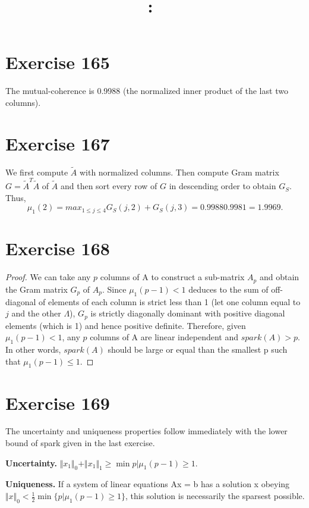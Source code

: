 \documentclass{article}
\date{}
\title{
    \textmd{\textbf{\hmwkClass:\ \hmwkTitle}}\\
}
\author{\hmwkAuthorName}
\begin{document}
\maketitle
\section{Exercise 165}
The mutual-coherence is 0.9988 (the normalized inner product of the last two columns).
\section{Exercise 167}
We first compute $\tilde A$ with normalized columns. Then compute Gram matrix $G = \tilde A^T\tilde A$ of $\tilde A$ and then sort every row of $G$ in descending order to obtain $G_S$. Thus,
$$
\mu_1(2) = max_{1\leq j \leq 4}G_S(j,2)+G_S(j,3) = 0.9988    0.9981 = 1.9969.
$$
\section{Exercise 168}
\begin{proof}
 We can take any $p$ columns of A to construct a sub-matrix $A_p$ and obtain the Gram matrix $G_p$ of $A_p$. Since $\mu_1(p-1) < 1$ deduces to the sum of off-diagonal of elements of each column is strict less than 1 (let one column equal to $j$ and the other $\Lambda$), $G_p$ is strictly diagonally dominant with positive diagonal elements (which is 1) and hence positive definite. Therefore, given $\mu_1(p-1) < 1$, any $p$ columns of A are linear independent and $spark(A)>p$. In other words, $spark(A)$ should be large or equal than the smallest p such that $\mu_1(p-1) \leq 1$.
\end{proof}

\section{Exercise 169}
The uncertainty and uniqueness properties follow immediately with the lower bound of spark given in the last exercise.

\textbf{Uncertainty.} $\Vert x_1 \Vert_0 + \Vert x_1 \Vert_1 \geq  \min{p\vert \mu_1(p-1)\geq1}$.

\textbf{Uniqueness.} If a system of linear equations Ax = b has a solution x obeying $\Vert x \Vert_0 < \frac{1}{2}\min\{p\vert \mu_1(p-1)\geq1\}$, this solution is necessarily the sparsest possible.
\end{document}
